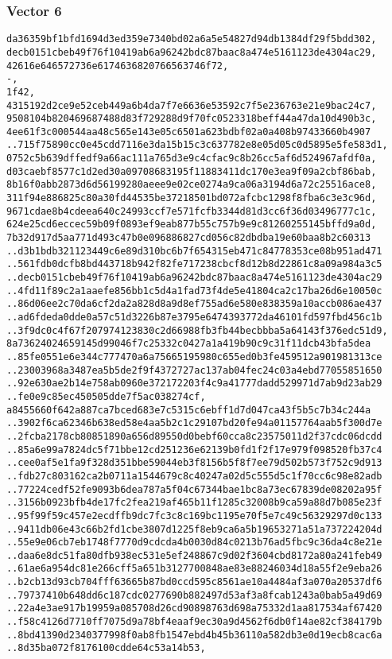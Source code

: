 \documentclass[
]{article}
\begin{document}
\subsubsection{Vector 6}\label{vector-6-2}

\begin{verbatim}
da36359bf1bfd1694d3ed359e7340bd02a6a5e54827d94db1384df29f5bdd302,
decb0151cbeb49f76f10419ab6a96242bdc87baac8a474e5161123de4304ac29,
42616e646572736e6174636820766563746f72,
-,
1f42,
4315192d2ce9e52ceb449a6b4da7f7e6636e53592c7f5e236763e21e9bac24c7,
9508104b820469687488d83f729288d9f70fc0523318beff44a47da10d490b3c,
4ee61f3c000544aa48c565e143e05c6501a623bdbf02a0a408b97433660b4907
..715f75890cc0e45cdd7116e3da15b15c3c637782e8e05d05c0d5895e5fe583d1,
0752c5b639dffedf9a66ac111a765d3e9c4cfac9c8b26cc5af6d524967afdf0a,
d03caebf8577c1d2ed30a09708683195f11883411dc170e3ea9f09a2cbf86bab,
8b16f0abb2873d6d56199280aeee9e02ce0274a9ca06a3194d6a72c25516ace8,
311f94e886825c80a30fd44535be37218501bd072afcbc1298f8fba6c3e3c96d,
9671cdae8b4cdeea640c24993ccf7e571fcfb3344d81d3cc6f36d03496777c1c,
624e25cd6eccec59b09f0893ef9eab877b55c757b9e9c81260255145bffd9a0d,
7b32d917d5aa771d493c47b0e096886827cd056c82dbdba19e60baa8b2c60313
..d3b1bdb321123449c6e89d310bc6b7f654315eb471c84778353ce08b951ad471
..561fdb0dcfb8bd443718b942f82fe717238cbcf8d12b8d22861c8a09a984a3c5
..decb0151cbeb49f76f10419ab6a96242bdc87baac8a474e5161123de4304ac29
..4fd11f89c2a1aaefe856bb1c5d4a1fad73f4de5e41804ca2c17ba26d6e10050c
..86d06ee2c70da6cf2da2a828d8a9d8ef755ad6e580e838359a10accb086ae437
..ad6fdeda0dde0a57c51d3226b87e3795e6474393772da46101fd597fbd456c1b
..3f9dc0c4f67f207974123830c2d66988fb3fb44becbbba5a64143f376edc51d9,
8a73624024659145d99046f7c25332c0427a1a419b90c9c31f11dcb43bfa5dea
..85fe0551e6e344c777470a6a75665195980c655ed0b3fe459512a901981313ce
..23003968a3487ea5b5de2f9f4372727ac137ab04fec24c03a4ebd77055851650
..92e630ae2b14e758ab0960e372172203f4c9a41777dadd529971d7ab9d23ab29
..fe0e9c85ec450505dde7f5ac038274cf,
a8455660f642a887ca7bced683e7c5315c6ebff1d7d047ca43f5b5c7b34c244a
..3902f6ca62346b638ed58e4aa5b2c1c29107bd20fe94a01157764aab5f300d7e
..2fcba2178cb80851890a656d89550d0bebf60cca8c23575011d2f37cdc06dcdd
..85a6e99a7824dc5f71bbe12cd251236e62139b0fd1f2f17e979f098520fb37c4
..cee0af5e1fa9f328d351bbe59044eb3f8156b5f8f7ee79d502b573f752c9d913
..fdb27c803162ca2b0711a1544679c8c40247a02d5c555d5c1f70cc6c98e82adb
..77224cedf52fe9093b6dea787a5f04c67344bae1bc8a73ec67839de08202a95f
..3156b0923bfb4de17fc2fea219af465b11f1285c32008b9ca59a88d7b085e23f
..95f99f59c457e2ecdffb9dc7fc3c8c169bc1195e70f5e7c49c56329297d0c133
..9411db06e43c66b2fd1cbe3807d1225f8eb9ca6a5b19653271a51a737224204d
..55e9e06cb7eb1748f7770d9cdcda4b0030d84c0213b76ad5fbc9c36da4c8e21e
..daa6e8dc51fa80dfb938ec531e5ef248867c9d02f3604cbd8172a80a241feb49
..61ae6a954dc81e266cff5a651b3127700848ae83e88246034d18a55f2e9eba26
..b2cb13d93cb704fff63665b87bd0ccd595c8561ae10a4484af3a070a20537df6
..79737410b648dd6c187cdc0277690b882497d53af3a8fcab1243a0bab5a49d69
..22a4e3ae917b19959a085708d26cd90898763d698a75332d1aa817534af67420
..f58c4126d7710ff7075d9a78bf4eaaf9ec30a9d4562f6db0f14ae82cf384179b
..8bd41390d2340377998f0ab8fb1547ebd4b45b36110a582db3e0d19ecb8cac6a
..8d35ba072f8176100cdde64c53a14b53,
\end{verbatim}
\end{document}
